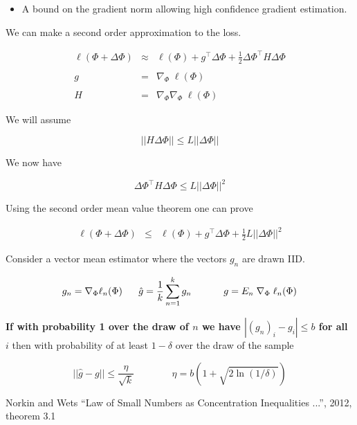 {\begin{itemize}
  \vfill
\item A bound on the gradient norm allowing high confidence gradient estimation.
\end{itemize}
  


We can make a second order approximation to the loss.

\begin{eqnarray*}
  \ell(\Phi + \Delta \Phi) & \approx & \ell(\Phi) + g^\top \Delta \Phi + \frac{1}{2} \Delta \Phi^\top H \Delta \Phi \\
  \\
  g & = & \nabla_\Phi\;\ell(\Phi) \\
  \\
  H & = & \nabla_\Phi \nabla_\Phi\; \ell(\Phi)
\end{eqnarray*}



We will assume

$$||H\Delta \Phi|| \leq L||\Delta \Phi||$$

We now have

\vfill
$$\Delta \Phi^\top H \Delta \Phi \leq L ||\Delta \Phi||^2$$

\vfill
Using the second order mean value theorem one can prove

\begin{eqnarray*}
  \ell(\Phi + \Delta \Phi)  & \leq &    \ell(\Phi) + g^\top \Delta \Phi + \frac{1}{2} L ||\Delta \Phi||^2
\end{eqnarray*}



Consider a vector mean estimator where the vectors $g_n$ are drawn IID.

$$g_n = \nabla_\Phi \ell_n(\Phi) \;\;\;\;\;\;\hat{g} = \frac{1}{k} \sum_{n=1}^k g_n \;\;\;\; \;\;\;\;\;\;\;\; g = E_{n}\;\nabla_\Phi\;\ell_n(\Phi)$$

\vfill
{\bf If with probability 1 over the draw of $n$ we have $|(g_n)_i - g_i| \leq b$ for all $i$} then with probability of at least $1-\delta$ over the draw of the sample

\vfill

$$||\hat{g} - g|| \leq \frac{\eta}{\sqrt{k}} \;\;\;\;\;\;\;\;\;\;\;\;\;\; \eta = b\left(1 + \sqrt{2 \ln (1/ \delta) }\right)$$


\vfill
{\huge Norkin and Wets ``Law of Small Numbers as Concentration Inequalities ...'', 2012, theorem 3.1}

}
